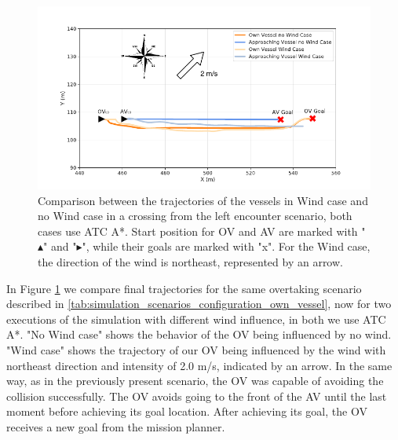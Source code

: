         
        \begin{figure}[H]
            \centering
            \includegraphics[width=\textwidth]{figs/Chap5/plot_ov_w_vs_wind.pdf}
            \caption{Comparison between the trajectories of the vessels in Wind case and no Wind case in a crossing from the left encounter scenario, both cases use \ac{ATC} A*. Start position for \ac{OV} and \ac{AV} are marked with "$\blacktriangle$" and "$\blacktriangleright$", while their goals are marked with "x". For the Wind case, the direction of the wind is northeast, represented by an arrow.}
            \label{fig:plot_ov_w_vs_wind}
        \end{figure}
        
        In Figure \ref{fig:plot_ov_w_vs_wind} we compare final trajectories for the same overtaking scenario described in \ref{tab:simulation_scenarios_configuration_own_vessel}, now for two executions of the simulation with different wind influence, in both we use \ac{ATC} A*. "No Wind case" shows the behavior of the \ac{OV} being influenced by no wind. "Wind case" shows the trajectory of our \ac{OV} being influenced by the wind with northeast direction and intensity of 2.0 m/s, indicated by an arrow. In the same way, as in the previously present scenario, the \ac{OV} was capable of avoiding the collision successfully.  The \ac{OV} avoids going to the front of the \ac{AV} until the last moment before achieving its goal location. After achieving its goal, the \ac{OV} receives a new goal from the mission planner.

